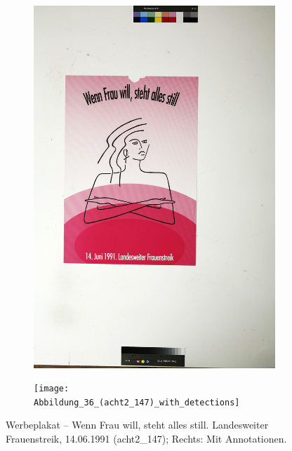 \documentclass[a4paper,12pt,ngerman]{article}
\begin{document}
\newpage
\begin{landscape}
\begin{figure}[ht]
	\begin{subfigure}[b]{0.5\linewidth}
	\centering
	\includegraphics[height=\linewidth]{Abbildung_40_(acht2_147)}
	\end{subfigure}
	\begin{subfigure}[b]{0.5\linewidth}
	\centering
	\texttt{[image: Abbildung\_36\_(acht2\_147)\_with\_detections]}
	\end{subfigure}
	\caption{Werbeplakat – Wenn Frau will, steht alles still. Landesweiter Frauenstreik, 14.06.1991 (acht2\_147); Rechts: Mit Annotationen.}
\end{figure}
\end{landscape}
\end{document}

